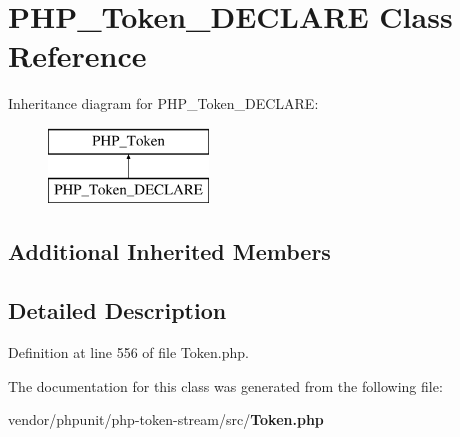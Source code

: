\section{P\+H\+P\+\_\+\+Token\+\_\+\+D\+E\+C\+L\+A\+R\+E Class Reference}
\label{class_p_h_p___token___d_e_c_l_a_r_e}
Inheritance diagram for P\+H\+P\+\_\+\+Token\+\_\+\+D\+E\+C\+L\+A\+R\+E\+:\begin{figure}[H]
\begin{center}
\leavevmode
\includegraphics[height=2.000000cm]{class_p_h_p___token___d_e_c_l_a_r_e}
\end{center}
\end{figure}
\subsection*{Additional Inherited Members}


\subsection{Detailed Description}


Definition at line 556 of file Token.\+php.



The documentation for this class was generated from the following file\+:\begin{DoxyCompactItemize}
\item 
vendor/phpunit/php-\/token-\/stream/src/{\bf Token.\+php}\end{DoxyCompactItemize}
